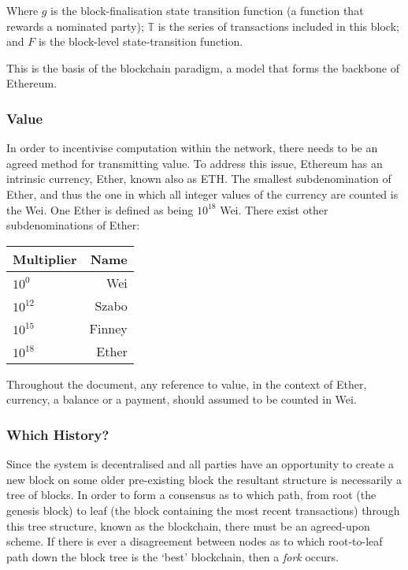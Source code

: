 \documentclass[9pt,oneside]{amsart}
\begin{document}
\begin{multicols}{2}
Where $g$ is the block-finalisation state transition function (a function that rewards a nominated party); $\mathbb{T}$ is the series of transactions included in this block; and $F$ is the block-level state-transition function.

This is the basis of the blockchain paradigm, a model that forms the backbone of Ethereum.

\subsubsection{Value}

In order to incentivise computation within the network, there needs to be an agreed method for transmitting value. To address this issue, Ethereum has an intrinsic currency, Ether, known also as ETH. The smallest subdenomination of Ether, and thus the one in which all integer values of the currency are counted is the Wei. One Ether is defined as being $10^{18}$ Wei. There exist other subdenominations of Ether:

\par\bigskip
\begin{center}
\begin{tabular}{lr}
\toprule
Multiplier & Name \\
\midrule
$10^0$ & Wei \\
$10^{12}$ & Szabo \\
$10^{15}$ & Finney \\
$10^{18}$ & Ether \\
\bottomrule
\end{tabular}
\end{center}
\par

Throughout the document, any reference to value, in the context of Ether, currency, a balance or a payment, should assumed to be counted in Wei.

\subsubsection{Which History?}

Since the system is decentralised and all parties have an opportunity to create a new block on some older pre-existing block the resultant structure is necessarily a tree of blocks. In order to form a consensus as to which path, from root (the genesis block) to leaf (the block containing the most recent transactions) through this tree structure, known as the blockchain, there must be an agreed-upon scheme. If there is ever a disagreement between nodes as to which root-to-leaf path down the block tree is the `best' blockchain, then a \textit{fork} occurs.


\end{multicols}
\end{document}
